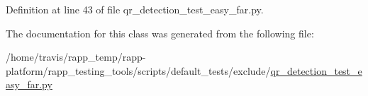 Definition at line 43 of file qr\-\_\-detection\-\_\-test\-\_\-easy\-\_\-far.\-py.



The documentation for this class was generated from the following file\-:\begin{DoxyCompactItemize}
\item 
/home/travis/rapp\-\_\-temp/rapp-\/platform/rapp\-\_\-testing\-\_\-tools/scripts/default\-\_\-tests/exclude/\hyperlink{qr__detection__test__easy__far_8py}{qr\-\_\-detection\-\_\-test\-\_\-easy\-\_\-far.\-py}\end{DoxyCompactItemize}
